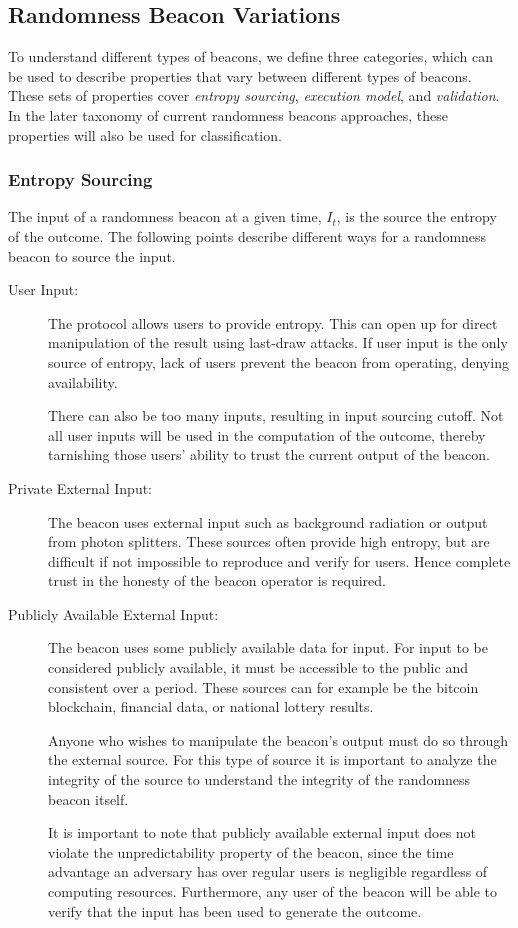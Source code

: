 \subsection{Randomness Beacon Variations}
 To understand different types of beacons, we define three categories, which can be used to describe properties that vary between different types of beacons. 
These sets of properties cover \emph{entropy sourcing}, \emph{execution model}, and \emph{validation}.
In the later taxonomy of current randomness beacons approaches, these properties will also be used for classification.

\subsubsection{Entropy Sourcing}
The input of a randomness beacon at a given time, $I_t$, is the source the entropy of the outcome.
The following points describe different ways for a randomness beacon to source the input.
\begin{description}
    \item[User Input:]
        The protocol allows users to provide entropy.
        This can open up for direct manipulation of the result using last-draw attacks.
        If user input is the only source of entropy, lack of users prevent the beacon from operating, denying availability. 

        There can also be too many inputs, resulting in input sourcing cutoff. Not all user inputs will be used in the computation of the outcome, thereby tarnishing those users' ability to trust the current output of the beacon.

    \item[Private External Input:]
        The beacon uses external input such as background radiation or output from photon splitters.
        These sources often provide high entropy, but are difficult if not impossible to reproduce and verify for users. Hence complete trust in the honesty of the beacon operator is required.

    \item[Publicly Available External Input:]
        The beacon uses some publicly available data for input. For input to be considered publicly available, it must be accessible to the public and consistent over a period.
        These sources can for example be the bitcoin blockchain, financial data, or national lottery results.

        Anyone who wishes to manipulate the beacon's output must do so through the external source.
        For this type of source it is important to analyze the integrity of the source to understand the integrity of the randomness beacon itself.

        It is important to note that publicly available external input does not violate the unpredictability property of the beacon, since the time advantage an adversary has over regular users is negligible regardless of computing resources.
        Furthermore, any user of the beacon will be able to verify that the input has been used to generate the outcome.

\end{description}

